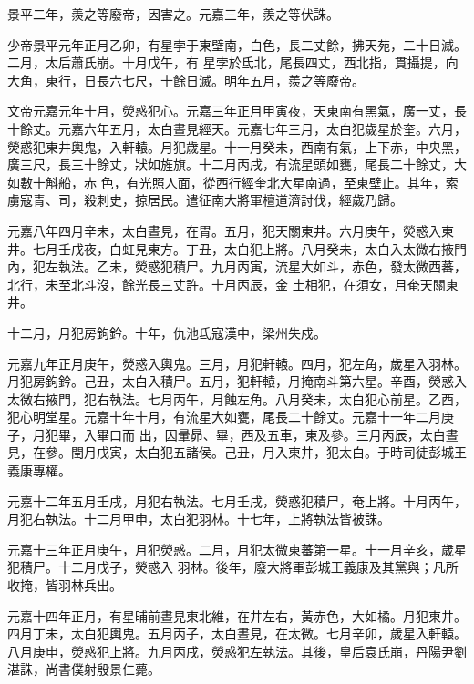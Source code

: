 \begin{pinyinscope}
 景平二年，羨之等廢帝，因害之。元嘉三年，羨之等伏誅。



 少帝景平元年正月乙卯，有星孛于東壁南，白色，長二丈餘，拂天苑，二十日滅。二月，太后蕭氏崩。十月戊午，有
 星孛於氐北，尾長四丈，西北指，貫攝提，向大角，東行，日長六七尺，十餘日滅。明年五月，羨之等廢帝。



 文帝元嘉元年十月，熒惑犯心。元嘉三年正月甲寅夜，天東南有黑氣，廣一丈，長十餘丈。元嘉六年五月，太白晝見經天。元嘉七年三月，太白犯歲星於奎。六月，熒惑犯東井輿鬼，入軒轅。月犯歲星。十一月癸未，西南有氣，上下赤，中央黑，廣三尺，長三十餘丈，狀如旌旗。十二月丙戌，有流星頭如甕，尾長二十餘丈，大如數十斛船，赤
 色，有光照人面，從西行經奎北大星南過，至東壁止。其年，索虜寇青、司，殺刺史，掠居民。遣征南大將軍檀道濟討伐，經歲乃歸。



 元嘉八年四月辛未，太白晝見，在胃。五月，犯天關東井。六月庚午，熒惑入東井。七月壬戌夜，白虹見東方。丁丑，太白犯上將。八月癸未，太白入太微右掖門內，犯左執法。乙未，熒惑犯積尸。九月丙寅，流星大如斗，赤色，發太微西蕃，北行，未至北斗沒，餘光長三丈許。十月丙辰，金
 土相犯，在須女，月奄天關東井。



 十二月，月犯房鉤鈐。十年，仇池氐寇漢中，梁州失戍。



 元嘉九年正月庚午，熒惑入輿鬼。三月，月犯軒轅。四月，犯左角，歲星入羽林。月犯房鉤鈐。己丑，太白入積尸。五月，犯軒轅，月掩南斗第六星。辛酉，熒惑入太微右掖門，犯右執法。七月丙午，月蝕左角。八月癸未，太白犯心前星。乙酉，犯心明堂星。元嘉十年十月，有流星大如甕，尾長二十餘丈。元嘉十一年二月庚子，月犯畢，入畢口而
 出，因暈昴、畢，西及五車，東及參。三月丙辰，太白晝見，在參。閏月戊寅，太白犯五諸侯。己丑，月入東井，犯太白。于時司徒彭城王義康專權。



 元嘉十二年五月壬戌，月犯右執法。七月壬戌，熒惑犯積尸，奄上將。十月丙午，月犯右執法。十二月甲申，太白犯羽林。十七年，上將執法皆被誅。



 元嘉十三年正月庚午，月犯熒惑。二月，月犯太微東蕃第一星。十一月辛亥，歲星犯積尸。十二月戊子，熒惑入
 羽林。後年，廢大將軍彭城王義康及其黨與；凡所收掩，皆羽林兵出。



 元嘉十四年正月，有星晡前晝見東北維，在井左右，黃赤色，大如橘。月犯東井。四月丁未，太白犯輿鬼。五月丙子，太白晝見，在太微。七月辛卯，歲星入軒轅。八月庚申，熒惑犯上將。九月丙戌，熒惑犯左執法。其後，皇后袁氏崩，丹陽尹劉湛誅，尚書僕射殷景仁薨。




\end{pinyinscope}
